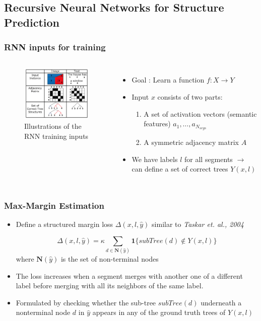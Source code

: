 \documentclass{beamer}
\begin{document}
\subsection{Recursive Neural Networks for Structure Prediction}
\frame
{
	\frametitle{RNN inputs for training}
	\begin{columns}
	\begin{figure}[ht]  
		\begin{center}
			\includegraphics[width=2.1in]{images/fig3.png}   
		\end{center}   
		\caption{Illustrations of the RNN training inputs}
	\end{figure}
	\begin{itemize}
	\item Goal : Learn a function $ f:\textit{X}\rightarrow\textit{Y} $
	\item Input $ x $ consists of two parts:
		\begin{enumerate}
		\item A set of activation vectors (semantic features) ${a_1, \dots, a_{N_{segs}}}$
		\item A symmetric adjacency matrix $ A $
		\end{enumerate}
		\item We have labels $l$ for all segments $\rightarrow$ can define a set of correct trees $Y(x, l)$ 
	\end{itemize}
	\end{columns}
}
\frame
{
	\frametitle{Max-Margin Estimation}
	\begin{itemize}
		\item Define a structured margin loss $\Delta(x,l,\hat{y})$ similar to \textit{Taskar et. al., 2004}
		\begin{Definition}
		$$ \Delta(x,l, \hat{y}) = \kappa \sum_{d \in \textbf{N}(\hat{y})} \textbf{1}\{\textit{subTree}(d) \notin Y(x,l)\}$$
		where $ \textbf{N}(\hat{y}) $ is the set of non-terminal nodes
		\end{Definition}
		\item The loss increases when a segment merges with another one of a different label before merging with all its neighbors of the same label. 
		\item Formulated by checking whether the sub-tree $\textit{subTree}(d)$ underneath a nonterminal node $d$ 
		in $\hat{y}$ appears in any of the ground truth trees of $Y(x,l)$
	\end{itemize}
}
\end{document}
